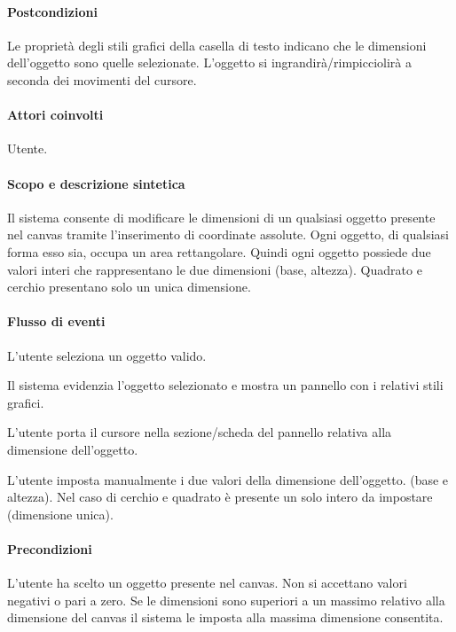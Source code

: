 \paragraph{Postcondizioni} Le propriet\`a  degli stili grafici della casella di testo indicano che le dimensioni dell'oggetto sono quelle selezionate. L'oggetto si ingrandir\` a/rimpicciolir\`a  a seconda dei movimenti del cursore.


\paragraph{Attori coinvolti} Utente.
\paragraph{Scopo e descrizione sintetica} Il sistema consente di modificare le dimensioni  di un qualsiasi oggetto presente nel canvas tramite l'inserimento di coordinate assolute.  Ogni oggetto, di qualsiasi forma esso sia, occupa un area rettangolare. Quindi ogni oggetto possiede due valori interi che rappresentano le due dimensioni (base, altezza). Quadrato e cerchio presentano solo un unica dimensione.
\paragraph{Flusso di eventi}
\begin{elenconumerato}[\textbf{}]{\subsubsecindent}
\item  L'utente seleziona un oggetto valido.
\item  Il sistema evidenzia l'oggetto selezionato e mostra un pannello con i relativi stili grafici.
\item  L'utente porta il cursore nella sezione/scheda del pannello relativa alla dimensione dell'oggetto.
\item  L'utente imposta manualmente i due valori della dimensione dell'oggetto.
(base e altezza). Nel caso di cerchio e quadrato  \`e  presente un solo intero da impostare (dimensione unica).
\end{elenconumerato}
\paragraph{Precondizioni} L'utente ha scelto un oggetto presente nel canvas. Non si accettano valori negativi o pari a zero. Se le dimensioni sono superiori a un massimo relativo alla dimensione del canvas il sistema le imposta alla massima dimensione consentita.
